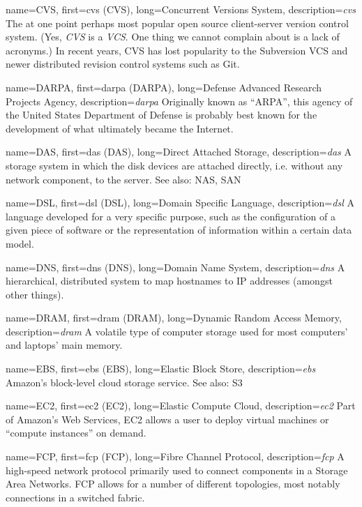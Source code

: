 {
	name={CVS},
	first={\acrlong{cvs} (CVS)},
	long={Concurrent Versions System},
	description={{\em \acrlong{cvs}} The at one point perhaps most
popular open source client-server version control system.  (Yes, {\em CVS}
is a {\em VCS}.  One thing we cannot complain about is a lack of
acronyms.)  In recent years, CVS has lost popularity to the Subversion VCS
and newer distributed revision control systems such as
Git.}
}

{
	name={DARPA},
	first={\acrlong{darpa} (DARPA)},
	long={Defense Advanced Research Projects Agency},
	description={{\em \acrlong{darpa}} Originally
known as ``ARPA'', this agency of the United States Department of Defense
is probably best known for the development of what ultimately became the
Internet.}
}

{
	name={DAS},
	first={\acrlong{das} (DAS)},
	long={Direct Attached Storage},
	description={{\em \acrlong{das}} A storage system in which the
disk devices are attached directly, i.e. without any network component, to
the server.  See also: NAS, SAN}
}

{
	name={DSL},
	first={\acrlong{dsl} (DSL)},
	long={Domain Specific Language},
	description={{\em \acrlong{dsl}} A language developed for a very
specific purpose, such as the configuration of a given piece of software
or the representation of information within a certain
data model.}
}

{
	name={DNS},
	first={\acrlong{dns} (DNS)},
	long={Domain Name System},
	description={{\em \acrlong{dns}} A hierarchical, distributed system to
map hostnames to IP addresses (amongst other things).}
}

{
	name={DRAM},
	first={\acrlong{dram} (DRAM)},
	long={Dynamic Random Access Memory},
	description={{\em \acrlong{dram}} A volatile type of computer
storage used for most computers' and laptops' main
memory.}
}

{
	name={EBS},
	first={\acrlong{ebs} (EBS)},
	long={Elastic Block Store},
	description={{\em \acrlong{ebs}} Amazon's block-level cloud storage service.  See also: S3}
}

{
	name={EC2},
	first={\acrlong{ec2} (EC2)},
	long={Elastic Compute Cloud},
	description={{\em \acrlong{ec2}} Part of Amazon's Web Services, EC2
allows a user to deploy virtual machines or ``compute instances'' on
demand.}
}

{
	name={FCP},
	first={\acrlong{fcp} (FCP)},
	long={Fibre Channel Protocol},
	description={{\em \acrlong{fcp}} A high-speed network protocol
primarily used to connect components in a Storage Area Networks.  FCP
allows for a number of different topologies, most notably connections in a
switched fabric.}
}

